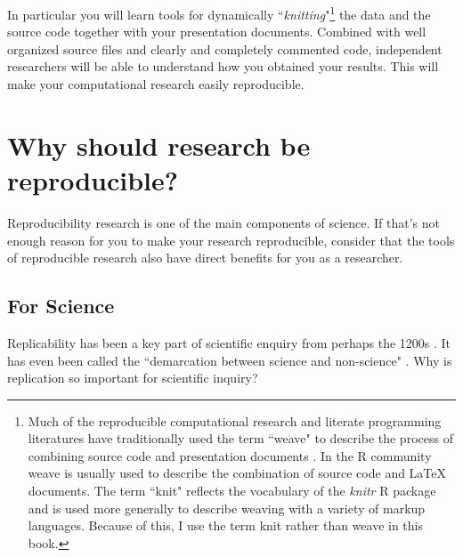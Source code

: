 In particular you will learn tools for dynamically ``{\emph{knitting}}"\footnote{Much of the reproducible computational research and literate programming literatures have traditionally used the term ``weave" to describe the process of combining source code and presentation documents \cite[see][101]{Knuth1992}. In the R community weave is usually used to describe the combination of source code and LaTeX documents. The term ``knit" reflects the vocabulary of the {\emph{knitr}} R package and is used more generally to describe weaving with a variety of markup languages. Because of this, I use the term knit rather than weave in this book.} the data and the source code together with your presentation documents. Combined with well organized source files and clearly and completely commented code, independent researchers will be able to understand how you obtained your results. This will make your computational research easily reproducible.


\section{Why should research be reproducible?}

Reproducibility research is one of the main components of science. If that's not enough reason for you to make your research reproducible, consider that the tools of reproducible research also have direct benefits for you as a researcher. 

\subsection{For Science}

Replicability has been a key part of scientific enquiry from perhaps the 1200s \cite[]{Bacon1267,Nosek2012}. It has even been called the ``demarcation between science and non-science" \cite[2]{Braude1979}. Why is replication so important for scientific inquiry? 

